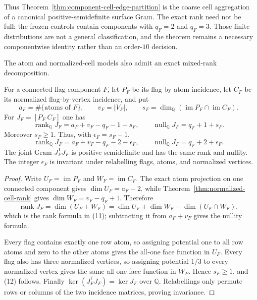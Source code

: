 Thus Theorem~\ref{thm:component-cell-edge-partition} is the coarse cell
aggregation of a canonical positive-semidefinite
surface Gram.  The exact rank need not be full: the frozen controls contain
components with $q_F=2$ and $q_F=3$.  Those finite distributions are not a
general classification, and the theorem remains a necessary componentwise
identity rather than an order-$10$ decision.

The atom and normalized-cell models also admit an exact mixed-rank
decomposition.

\begin{theorem}
\label{thm:joint-atom-cell-rank}
For a connected flag component $F$, let $P_F$ be its flag-by-atom incidence,
let $C_F$ be its normalized flag-by-vertex incidence, and put
\[
 a_F=\#\{\text{atoms of }F\},\qquad
 v_F=|V_F|,\qquad
 s_F=\dim_{\mathbb Q}(\operatorname{im}P_F\cap
                      \operatorname{im}C_F).
\]
For $J_F=[P_F\ C_F]$ one has
\[
 \operatorname{rank}_{\mathbb Q}J_F
   =a_F+v_F-q_F-1-s_F,
 \qquad
 \operatorname{null}_{\mathbb Q}J_F=q_F+1+s_F.       \tag{11}
\]
Moreover $s_F\geq1$.  Thus, with $\epsilon_F=s_F-1$,
\[
 \operatorname{rank}_{\mathbb Q}J_F
   =a_F+v_F-q_F-2-\epsilon_F,
 \qquad
 \operatorname{null}_{\mathbb Q}J_F=q_F+2+\epsilon_F.\tag{12}
\]
The joint Gram $J_F^{\mathsf T}J_F$ is positive semidefinite and has the
same rank and nullity.  The integer $\epsilon_F$ is invariant under
relabelling flags, atoms, and normalized vertices.
\end{theorem}

\begin{proof}
Write $U_F=\operatorname{im}P_F$ and
$W_F=\operatorname{im}C_F$.  The exact atom projection on one connected
component gives $\dim U_F=a_F-2$, while
Theorem~\ref{thm:normalized-cell-rank} gives
$\dim W_F=v_F-q_F+1$.  Therefore
\[
 \operatorname{rank}J_F=\dim(U_F+W_F)
 =\dim U_F+\dim W_F-\dim(U_F\cap W_F),
\]
which is the rank formula in (11); subtracting it from $a_F+v_F$ gives the
nullity formula.

Every flag contains exactly one row atom, so assigning potential one to all
row atoms and zero to the other atoms gives the all-one face function in
$U_F$.  Every flag also has three normalized vertices, so assigning
potential $1/3$ to every normalized vertex gives the same all-one face
function in $W_F$.  Hence $s_F\geq1$, and (12) follows.  Finally
$\ker(J_F^{\mathsf T}J_F)=\ker J_F$ over $\mathbb Q$.  Relabellings only
permute rows or columns of the two incidence matrices, proving invariance.
\end{proof}

